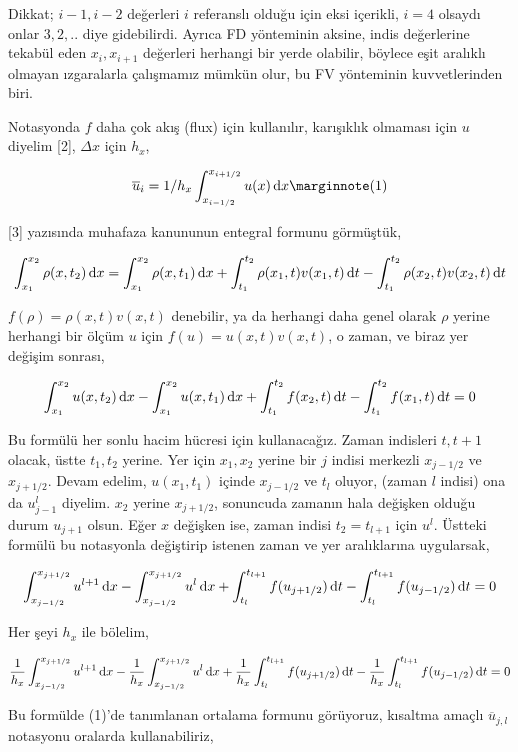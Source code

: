 \documentclass[12pt,fleqn]{article}\usepackage{../../common}
\begin{document}
Dikkat; $i-1,i-2$ değerleri $i$ referanslı olduğu için eksi içerikli, $i=4$
olsaydı onlar $3,2,..$ diye gidebilirdi. Ayrıca FD yönteminin aksine, indis
değerlerine tekabül eden $x_i,x_{i+1}$ değerleri herhangi bir yerde olabilir,
böylece eşit aralıklı olmayan ızgaralarla çalışmamız mümkün olur, bu FV
yönteminin kuvvetlerinden biri.

Notasyonda $f$ daha çok akış (flux) için kullanılır, karışıklık olmaması
için $u$ diyelim [2], $\Delta x$ için $h_x$,

$$
\overline{u}_i = 1/h_x \int_{x_{i-1/2}}^{x_{i+1/2}} u(x) \ud x
\mlabel{1}
$$

[3] yazısında muhafaza kanununun entegral formunu görmüştük,

$$
\int _{x_1}^{x_2} \rho(x,t_2) \,\mathrm{d} x =
\int _{x_1}^{x_2} \rho(x,t_1) \,\mathrm{d} x  +
\int_{t_1}^{t_2} \rho(x_1,t) v(x_1,t) \,\mathrm{d} t -
\int_{t_1}^{t_2}  \rho(x_2,t) v(x_2,t) \,\mathrm{d} t
$$

$f(\rho) = \rho(x,t) v(x,t)$ denebilir, ya da herhangi daha genel olarak $\rho$
yerine herhangi bir ölçüm $u$ için $f(u) = u(x,t) v(x,t)$, o zaman, ve
biraz yer değişim sonrası,

$$
\int_{x_1}^{x_2} u(x,t_2) \,\mathrm{d} x -
\int_{x_1}^{x_2} u(x,t_1) \,\mathrm{d} x  +
\int_{t_1}^{t_2} f(x_2,t) \,\mathrm{d} t  -
\int_{t_1}^{t_2} f(x_1,t) \,\mathrm{d} t = 0
$$

Bu formülü her sonlu hacim hücresi için kullanacağız. Zaman indisleri $t,t+1$
olacak, üstte $t_1,t_2$ yerine. Yer için $x_1,x_2$ yerine bir $j$ indisi
merkezli $x_{j-1/2}$ ve $x_{j+1/2}$. Devam edelim, $u(x_1,t_1)$ içinde
$x_{j-1/2}$ ve $t_l$ oluyor, (zaman $l$ indisi) ona da $u_{j-1}^l$
diyelim. $x_2$ yerine $x_{j+1/2}$, sonuncuda zamanın hala değişken olduğu durum
$u_{j+1}$ olsun. Eğer $x$ değişken ise, zaman indisi $t_2 = t_{l+1}$ için
$u^{l}$. Üstteki formülü bu notasyonla değiştirip istenen zaman ve yer
aralıklarına uygularsak,

$$
\int_{x_{j-1/2}}^{x_{j+1/2}} u^{l+1} \,\mathrm{d} x -
\int_{x_{j-1/2}}^{x_{j+1/2}} u^{l} \,\mathrm{d} x  +
\int_{t_l}^{t_{l+1}} f(u_{j+1/2}) \,\mathrm{d} t  -
\int_{t_l}^{t_{l+1}} f(u_{j-1/2}) \,\mathrm{d} t = 0
$$

Her şeyi $h_x$ ile bölelim,

$$
\frac{1}{h_x} \int_{x_{j-1/2}}^{x_{j+1/2}} u^{l+1} \,\mathrm{d} x -
\frac{1}{h_x} \int_{x_{j-1/2}}^{x_{j+1/2}} u^{l} \,\mathrm{d} x  +
\frac{1}{h_x} \int_{t_l}^{t_{l+1}} f(u_{j+1/2}) \,\mathrm{d} t  -
\frac{1}{h_x} \int_{t_l}^{t_{l+1}} f(u_{j-1/2}) \,\mathrm{d} t = 0
$$

Bu formülde (1)'de tanımlanan ortalama formunu görüyoruz, kısaltma amaçlı
$\overline{u}_{j,l}$ notasyonu oralarda kullanabiliriz,
\end{document}
